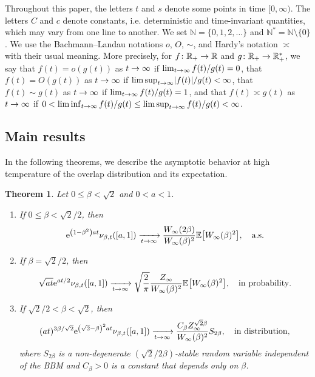 \documentclass[10pt]{amsart}
\newtheorem{theo}{Theorem}[section]
\theoremstyle{definition}\newtheorem{defi}[theo]{Definition}\newtheorem{rema}[theo]{Remark}\newtheorem{exam}[theo]{Example}\newtheorem{exem}[theo]{Example}\newtheorem{nota}[theo]{Notation}
\newcommand{\e}{\mathrm{e}}
\newcommand{\N}{\mathbb{N}}
\newcommand{\R}{\mathbb{R}}
\newcommand\1{\mathds{1}}
\newcommand{\Expec}[1]{\mathbb{E}\left[#1\right]}
\newcommand{\abs}[1]{\left\lvert#1\right\rvert}
\newcommand*{\relabel}{\renewcommand{\labelenumi}{(\theenumi)}}
\newcommand*{\romanenumi}{\renewcommand*{\theenumi}{\roman{enumi}}\relabel}
\let\originalleft\left
\let\originalright\right
\renewcommand{\left}{\mathopen{}\mathclose\bgroup\originalleft}
\renewcommand{\right}{\aftergroup\egroup\originalright}
\renewcommand*{\to}{\mathchoice{\longrightarrow}{\rightarrow}{\rightarrow}{\rightarrow}}
\begin{document}
Throughout this paper, the letters $t$ and $s$ denote some points in time $[0, \infty)$. The letters $C$ and $c$ denote constants, i.e. deterministic and time-invariant quantities, which may vary from one line to another. We set $\N = \{0,1,2,\dots\}$ and $\N^* = \N \setminus \{0\}$. We use the Bachmann--Landau notations $o$, $O$, $\sim$, and Hardy's notation $\asymp$ with their usual meaning. More precisely, for $f \colon \R_+ \to \R$ and $g \colon \R_+ \to \R_+^*$, we say that $f(t) = o(g(t))$ as $t \to \infty$ if $\lim_{t\to\infty} f(t)/g(t) = 0$, that $f(t) = O(g(t))$ as $t \to \infty$ if $\limsup_{t\to\infty} \abs{f(t)}/g(t) < \infty$, that $f(t) \sim g(t)$ as $t \to \infty$ if $\lim_{t\to\infty} f(t)/g(t) = 1$, and that $f(t) \asymp g(t)$ as $t \to \infty$ if $0 < \liminf_{t\to\infty} f(t)/g(t) \leq \limsup_{t\to\infty} f(t)/g(t) < \infty$.

\subsection{Main results}

In the following theorems, we describe the asymptotic behavior at high temperature of the overlap distribution and its expectation.


\begin{theo}\label{thm:asymptotics_of_the_overlap_distribution}
Let $0 \leq \beta < \sqrt{2}$ and $0 < a < 1$.
\begin{enumerate}\romanenumi
\item\label{it:asymptotics_of_the_overlap_distribution_1}
If $0 \leq \beta < \sqrt{2}/2$, then
\begin{equation*}
\e^{\left(1 - \beta^2\right)at} \nu_{\beta, t}([a, 1]) \xrightarrow[t \to \infty]{} \frac{W_\infty(2\beta)}{W_\infty(\beta)^2} \Expec{W_\infty(\beta)^2}, \quad \text{a.s.}
\end{equation*}
\item\label{it:asymptotics_of_the_overlap_distribution_2}
If $\beta = \sqrt{2}/2$, then
\begin{equation*}
\sqrt{at} \e^{at/2} \nu_{\beta, t}([a, 1]) \xrightarrow[t \to \infty]{} \sqrt{\frac{2}{\pi}} \frac{Z_\infty}{W_\infty(\beta)^2} \Expec{W_\infty(\beta)^2}, \quad \text{in probability}.
\end{equation*}
\item\label{it:asymptotics_of_the_overlap_distribution_3}
If $\sqrt{2}/2 < \beta < \sqrt{2}$, then
\begin{equation*}
(at)^{3 \beta/\sqrt{2}} \e^{\left(\sqrt{2} - \beta\right)^2 at} \nu_{\beta, t}([a, 1]) \xrightarrow[t \to \infty]{} \frac{C_\beta Z_\infty^{\sqrt{2}\beta}}{W_\infty(\beta)^2} S_{2\beta}, \quad \text{in distribution},
\end{equation*}
where $S_{2\beta}$ is a non-degenerate $(\sqrt{2}/2\beta)$-stable random variable independent of the BBM and $C_\beta > 0$ is a constant that depends only on $\beta$.
\end{enumerate}
\end{theo}
\end{document}

